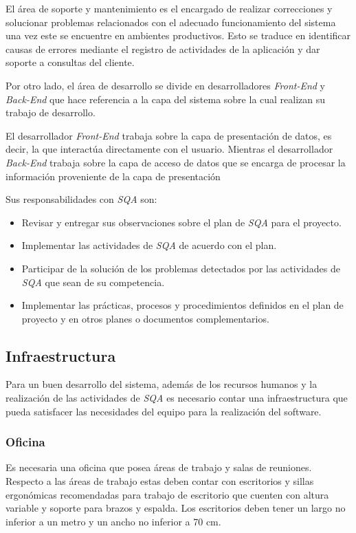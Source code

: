 El área de soporte y mantenimiento es el encargado de realizar correcciones y solucionar problemas relacionados con el adecuado funcionamiento del sistema una vez este se encuentre en ambientes productivos. Esto se traduce en identificar causas de errores mediante el registro de actividades de la aplicación y dar soporte a consultas del cliente.

Por otro lado, el área de desarrollo se divide en desarrolladores \emph{Front-End} y \emph{Back-End} que hace referencia a la capa del sistema sobre la cual realizan su trabajo de desarrollo. 

El desarrollador \emph{Front-End} trabaja sobre la capa de presentación de datos, es decir, la que interactúa directamente con el usuario. Mientras el desarrollador \emph{Back-End} trabaja sobre la capa de acceso de datos que se encarga de procesar la información proveniente de la capa de presentación

Sus responsabilidades con \emph{SQA} son: 

	\begin{itemize}
		\item
		Revisar y entregar sus observaciones sobre el plan de \emph{SQA} para el proyecto.
		\item
		Implementar las actividades de \emph{SQA} de acuerdo con el plan.
		\item
		Participar de la solución de los problemas detectados por las actividades de \emph{SQA} que sean de su competencia.
		\item
		Implementar las prácticas, procesos y procedimientos definidos en el plan de proyecto y en otros planes o documentos complementarios.
	\end{itemize}

\subsection{Infraestructura}
Para un buen desarrollo del sistema, además de los recursos humanos y la realización de las actividades de \emph{SQA} es necesario contar una infraestructura que pueda satisfacer las necesidades del equipo para la realización del software. 

\subsubsection{Oficina}

Es necesaria una oficina que posea áreas de trabajo y salas de reuniones. Respecto a las áreas de trabajo estas deben contar con escritorios y sillas ergonómicas recomendadas para trabajo de escritorio que cuenten con altura variable y soporte para brazos y espalda. Los escritorios deben tener un largo no inferior a un metro y un ancho no inferior a 70 cm. 

